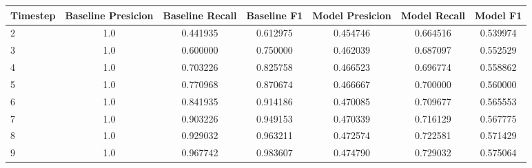 \begin{tabular}{lcccccc}
\toprule
 Timestep &  Baseline Presicion &  Baseline Recall &  Baseline F1 &  Model Presicion &  Model Recall &  Model F1 \\
\midrule
        2 &                 1.0 &         0.441935 &     0.612975 &         0.454746 &      0.664516 &  0.539974 \\
        3 &                 1.0 &         0.600000 &     0.750000 &         0.462039 &      0.687097 &  0.552529 \\
        4 &                 1.0 &         0.703226 &     0.825758 &         0.466523 &      0.696774 &  0.558862 \\
        5 &                 1.0 &         0.770968 &     0.870674 &         0.466667 &      0.700000 &  0.560000 \\
        6 &                 1.0 &         0.841935 &     0.914186 &         0.470085 &      0.709677 &  0.565553 \\
        7 &                 1.0 &         0.903226 &     0.949153 &         0.470339 &      0.716129 &  0.567775 \\
        8 &                 1.0 &         0.929032 &     0.963211 &         0.472574 &      0.722581 &  0.571429 \\
        9 &                 1.0 &         0.967742 &     0.983607 &         0.474790 &      0.729032 &  0.575064 \\
\bottomrule
\end{tabular}
